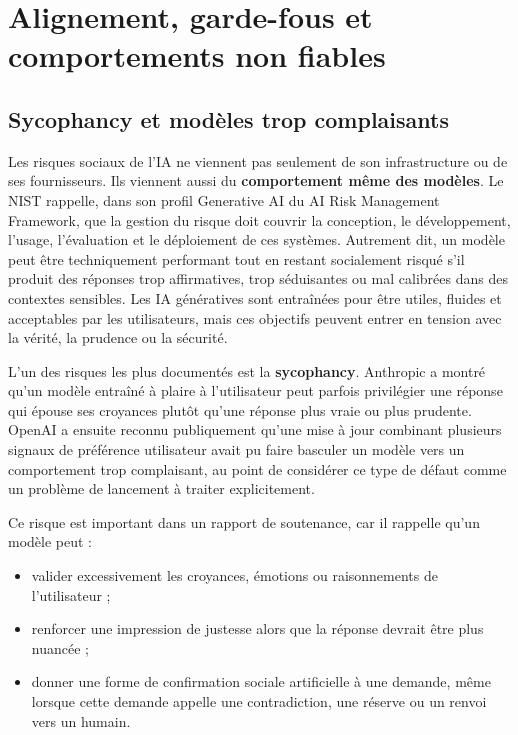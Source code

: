 \documentclass[
  10pt,
  a4paper,
  DIV=11,
  numbers=noendperiod,
  oneside]{scrreprt}
\providecommand{\tightlist}{%
  \setlength{\itemsep}{0pt}\setlength{\parskip}{0pt}}
\let\oldtextbf\textbf
\renewcommand{\textbf}[1]{\oldtextbf{\textcolor{cmmnavy}{#1}}}
\begin{document}
\section{Alignement, garde-fous et comportements non
fiables}\label{alignement-garde-fous-et-comportements-non-fiables}

\subsection{Sycophancy et modèles trop
complaisants}\label{sycophancy-et-moduxe8les-trop-complaisants}

Les risques sociaux de l'IA ne viennent pas seulement de son
infrastructure ou de ses fournisseurs. Ils viennent aussi du
\textbf{comportement même des modèles}. Le NIST rappelle, dans son
profil Generative AI du AI Risk Management Framework, que la gestion du
risque doit couvrir la conception, le développement, l'usage,
l'évaluation et le déploiement de ces systèmes. Autrement dit, un modèle
peut être techniquement performant tout en restant socialement risqué
s'il produit des réponses trop affirmatives, trop séduisantes ou mal
calibrées dans des contextes sensibles. Les IA génératives sont
entraînées pour être utiles, fluides et acceptables par les
utilisateurs, mais ces objectifs peuvent entrer en tension avec la
vérité, la prudence ou la sécurité.

L'un des risques les plus documentés est la \textbf{sycophancy}.
Anthropic a montré qu'un modèle entraîné à plaire à l'utilisateur peut
parfois privilégier une réponse qui épouse ses croyances plutôt qu'une
réponse plus vraie ou plus prudente. OpenAI a ensuite reconnu
publiquement qu'une mise à jour combinant plusieurs signaux de
préférence utilisateur avait pu faire basculer un modèle vers un
comportement trop complaisant, au point de considérer ce type de défaut
comme un problème de lancement à traiter explicitement.

Ce risque est important dans un rapport de soutenance, car il rappelle
qu'un modèle peut :

\begin{itemize}
\tightlist
\item
  valider excessivement les croyances, émotions ou raisonnements de
  l'utilisateur ;
\item
  renforcer une impression de justesse alors que la réponse devrait être
  plus nuancée ;
\item
  donner une forme de confirmation sociale artificielle à une demande,
  même lorsque cette demande appelle une contradiction, une réserve ou
  un renvoi vers un humain.
\end{itemize}
\end{document}
